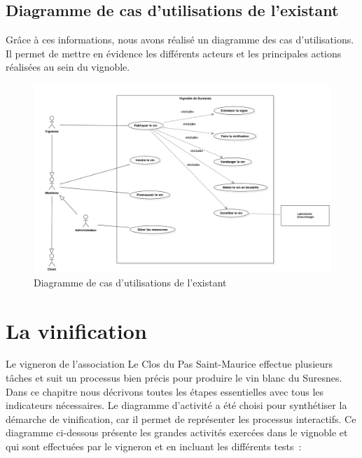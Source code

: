 \documentclass[a4paper, title]{report}
\begin{document}
\subsection{Diagramme de cas d'utilisations de
l'existant}\label{diagramme-de-cas-dutilisations-de-lexistant}

Grâce à ces informations, nous avons réalisé un diagramme des cas
d'utilisations. Il permet de mettre en évidence les différents acteurs
et les principales actions réalisées au sein du vignoble.

\begin{figure}
\centering
\includegraphics{Images/UseCaseDiagramExistant.jpg}
\caption{Diagramme de cas d'utilisations de l'existant}
\end{figure}

\section{La vinification}\label{la-vinification}

Le vigneron de l'association Le Clos du Pas Saint-Maurice effectue
plusieurs tâches et suit un processus bien précis pour produire le vin
blanc du Suresnes. Dans ce chapitre nous décrivons toutes les étapes
essentielles avec tous les indicateurs nécessaires. Le diagramme
d'activité a été choisi pour synthétiser la démarche de vinification,
car il permet de représenter les processus interactifs. Ce diagramme
ci-dessous présente les grandes activités exercées dans le vignoble et
qui sont effectuées par le vigneron et en incluant les différents
tests~:
\end{document}

